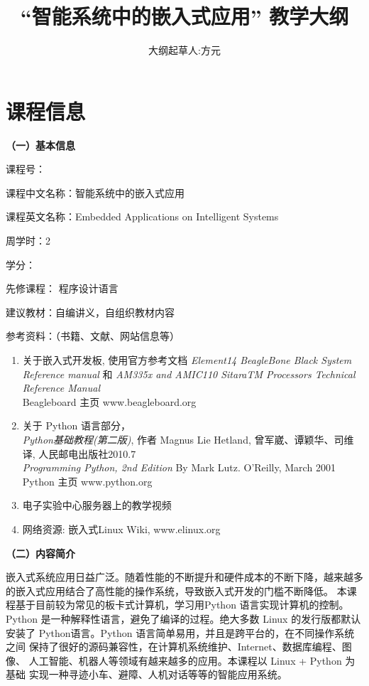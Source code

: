\documentclass{article}
\title{``智能系统中的嵌入式应用''  教学大纲}
\author{大纲起草人:方元}
\begin{document}
\maketitle

\setlength\parindent{1em}

\section{课程信息}

\textbf{（一）基本信息}

课程号：

课程中文名称：智能系统中的嵌入式应用

课程英文名称：Embedded Applications on Intelligent Systems

周学时：2

学分：

先修课程： 程序设计语言

建议教材：自编讲义，自组织教材内容

参考资料：（书籍、文献、网站信息等）

 \begin{enumerate}
    \item 关于嵌入式开发板, 使用官方参考文档
        {\em  Element14 BeagleBone Black System Reference manual}
         和
         {\em AM335x and AMIC110 SitaraTM Processors
         Technical Reference Manual} \\
         Beagleboard 主页   www.beagleboard.org
    \item 关于 Python 语言部分，\\
         {\em Python基础教程(第二版)},
          作者 Magnus Lie Hetland, 曾军崴、谭颖华、司维译,
          人民邮电出版社2010.7\\
          {\em  Programming Python, 2nd Edition}
          By Mark Lutz. O'Reilly, March 2001\\
        Python 主页 www.python.org
    \item 电子实验中心服务器上的教学视频
    \item 网络资源: 嵌入式Linux Wiki, www.elinux.org
 \end{enumerate}

\textbf{（二）内容简介}

   嵌入式系统应用日益广泛。随着性能的不断提升和硬件成本的不断下降，越来越多
   的嵌入式应用结合了高性能的操作系统，导致嵌入式开发的门槛不断降低。
   本课程基于目前较为常见的板卡式计算机，学习用Python 语言实现计算机的控制。
   Python 是一种解释性语言，避免了编译的过程。绝大多数 Linux 的发行版都默认
   安装了 Python语言。Python 语言简单易用，并且是跨平台的，在不同操作系统之间
   保持了很好的源码兼容性，在计算机系统维护、Internet、数据库编程、图像、
   人工智能、机器人等领域有越来越多的应用。本课程以 Linux + Python 为基础
   实现一种寻迹小车、避障、人机对话等等的智能应用系统。
\end{document}
